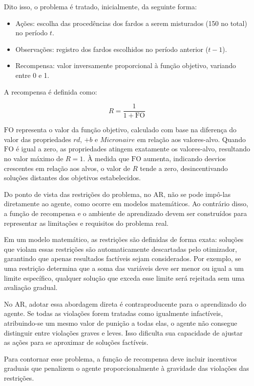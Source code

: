 \documentclass[
    12pt,                %
    openright,           %
    oneside,             %
    a4paper,             %
    english,             %
    spanish,             %
    brazil               %
]{ufscar}
\begin{document}
Dito isso, o problema é tratado, inicialmente, da seguinte forma:
\begin{itemize}
    \item Ações: escolha das procedências dos fardos a serem misturados (150 no total) no período $t$.
    \item Observações: registro dos fardos escolhidos no período anterior ($t-1$).
    \item Recompensa: valor inversamente proporcional à função objetivo, variando entre 0 e 1.
\end{itemize}

A recompensa é definida como:

\begin{equation}
    R = \frac{1}{1 + \text{FO}}
\end{equation}

$\text{FO}$ representa o valor da função objetivo, calculado com base na diferença do valor das propriedades $rd$, $+b$ e $Micronaire$ em relação aos valores-alvo. Quando $\text{FO}$ é igual a zero, as propriedades atingem exatamente os valores-alvo, resultando no valor máximo de $R = 1$. À medida que $\text{FO}$ aumenta, indicando desvios crescentes em relação aos alvos, o valor de $R$ tende a zero, desincentivando soluções distantes dos objetivos estabelecidos.

Do ponto de vista das restrições do problema, no AR, não se pode impô-las diretamente ao agente, como ocorre em modelos matemáticos. Ao contrário disso, a função de recompensa e o ambiente de aprendizado devem ser construídos para representar as limitações e requisitos do problema real.

Em um modelo matemático, as restrições são definidas de forma exata: soluções que violam essas restrições são automaticamente descartadas pelo otimizador, garantindo que apenas resultados factíveis sejam considerados. Por exemplo, se uma restrição determina que a soma das variáveis deve ser menor ou igual a um limite específico, qualquer solução que exceda esse limite será rejeitada sem uma avaliação gradual.

No AR, adotar essa abordagem direta é contraproducente para o aprendizado do agente. Se todas as violações forem tratadas como igualmente infactíveis, atribuindo-se um mesmo valor de punição a todas elas, o agente não consegue distinguir entre violações graves e leves. Isso dificulta sua capacidade de ajustar as ações para se aproximar de soluções factíveis.

Para contornar esse problema, a função de recompensa deve incluir incentivos graduais que penalizem o agente proporcionalmente à gravidade das violações das restrições.
\end{document}
